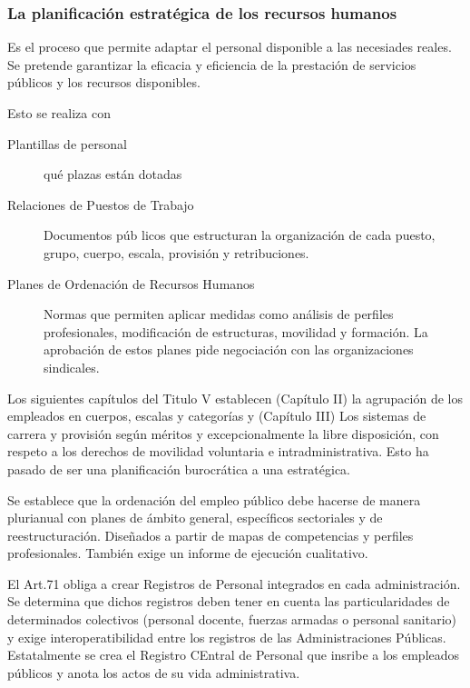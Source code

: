     \subsubsection{La planificación estratégica de los recursos humanos} %
        Es el proceso que permite adaptar el personal disponible a las necesiades reales. Se pretende garantizar la eficacia y eficiencia de la prestación de servicios públicos y los recursos disponibles.

        Esto se realiza con
        \begin{description}
            \item[Plantillas de personal] qué plazas están dotadas
            \item[Relaciones de Puestos de Trabajo] Documentos púb licos que estructuran la organización de cada puesto, grupo, cuerpo, escala, provisión y retribuciones.
            \item[Planes de Ordenación de Recursos Humanos] Normas que permiten aplicar medidas como análisis de perfiles profesionales, modificación de estructuras, movilidad y formación. La aprobación de estos planes pide negociación con las organizaciones sindicales.
        \end{description}

        Los siguientes capítulos del Titulo V establecen (Capítulo II) la agrupación de los empleados en cuerpos, escalas y categorías y (Capítulo III) Los sistemas de carrera y provisión según méritos y excepcionalmente la libre disposición, con respeto a los derechos de movilidad voluntaria e intradministrativa. Esto ha pasado de ser una planificación burocrática a una estratégica.
        
        Se establece que la ordenación del empleo público debe hacerse de manera plurianual con planes de ámbito general, específicos sectoriales y de reestructuración. Diseñados a partir de mapas de competencias y perfiles profesionales. También exige un informe de ejecución cualitativo.

        El Art.71 obliga a crear Registros de Personal integrados en cada administración. Se determina que dichos registros deben tener en cuenta las particularidades de determinados colectivos (personal docente, fuerzas armadas o personal sanitario) y exige interoperatibilidad entre los registros de las Administraciones Públicas. Estatalmente se crea el Registro CEntral de Personal que insribe a los empleados públicos y anota los actos de su vida administrativa.

